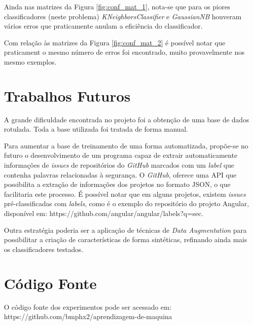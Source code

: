 \documentclass[conference]{IEEEtran}
\begin{document}
Ainda nas matrizes da Figura \ref{fig:conf_mat_1}, nota-se que para os piores classificadores (neste problema) \textit{KNeighborsClassifier} e \textit{GaussianNB} houveram vários erros que praticamente anulam a eficiência do classificador.

Com relação às matrizes da Figura \ref{fig:conf_mat_2} é possível notar que praticament o mesmo número de erros foi encontrado, muito provavelmente nos mesmo exemplos.

\section{Trabalhos Futuros}

A grande dificuldade encontrada no projeto foi a obtenção de uma base de dados rotulada. Toda a base utilizada foi tratada de forma manual.

Para aumentar a base de treinamento de uma forma automatizada, propõe-se no futuro o desenvolvimento de um programa capaz de extrair automaticamente informações de \textit{issues} de repositórios do \textit{GitHub} marcados com um \textit{label} que contenha palavras relacionadas à segurança. O \textit{GitHub}, oferece uma API que possibilita a extração de informações dos projetos no formato JSON, o que facilitaria este processo. É possível notar que em alguns projetos, existem \textit{issues} pré-classificadas com \textit{labels}, como é o exemplo do repositório do projeto Angular, disponível em: https://github.com/angular/angular/labels?q=sec.

Outra estratégia poderia ser a aplicação de técnicas de \textit{Data Augmentation} para possibilitar a criação de características de forma sintéticas, refinando ainda mais os classificadores testados.

\section{Código Fonte}

O código fonte dos experimentos pode ser acessado em: https://github.com/bmphx2/aprendizagem-de-maquina



\end{document}
